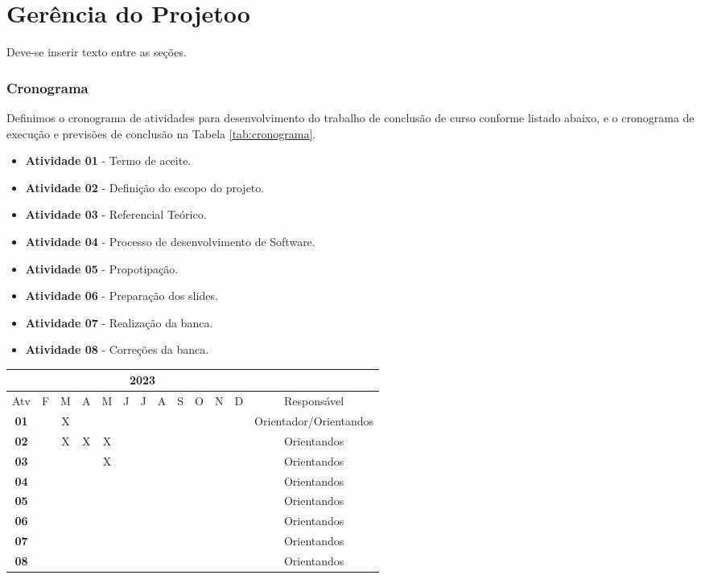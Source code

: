 \chapter{Gerência do Projetoo}\label{cap:desenvolvimento}
Deve-se inserir texto entre as seções.
\subsection{Cronograma}

Definimos o cronograma de atividades para desenvolvimento do trabalho de conclusão de curso conforme listado abaixo, e o cronograma de execução e previsões de conclusão na Tabela \ref{tab:cronograma}.

\begin{itemize}
    \item \textbf{Atividade 01} - Termo de aceite.
    \item \textbf{Atividade 02} - Definição do escopo do projeto.
    \item \textbf{Atividade 03} - Referencial Teórico.
    \item \textbf{Atividade 04} - Processo de desenvolvimento de Software.
    \item \textbf{Atividade 05} - Propotipação.
    \item \textbf{Atividade 06} - Preparação dos slides.
    \item \textbf{Atividade 07} - Realização da banca.
    \item \textbf{Atividade 08} - Correções da banca.
\end{itemize}

\begin{table*}[ht]
\centering
\caption{Cronograma das atividades}
\label{tab:cronograma}
\begin{tabular}{|c|c|c|c|c|c|c|c|c|c|c|c|c|}
\hline & \multicolumn{11}{|c|}{2023} & \multicolumn{1}{|c|}{} \\
\hline \multicolumn{1}{|c|}{Atv} & F & M & A & M & J & J & A & S & O & N & D & {Responsável} \\
\hline \textbf{01} & & X& & & & & & & & & & Orientador/Orientandos \\
\hline \textbf{02} & & X& X& X& & & & & & & & Orientandos \\
\hline \textbf{03} & & & & X& & & & & & & & Orientandos\\
\hline \textbf{04} & & & & & & & & & & & & Orientandos\\
\hline \textbf{05} & & & & & & & & & & & & Orientandos\\
\hline \textbf{06} & & & & & & & & & & & & Orientandos\\
\hline \textbf{07} & & & & & & & & & & & & Orientandos\\
\hline \textbf{08} & & & & & & & & & & & & Orientandos\\
\hline
\end{tabular} 
\end{table*}

